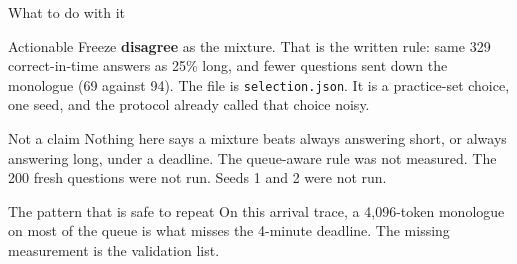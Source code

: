 \documentclass[aspectratio=169,11pt]{beamer}
\begin{document}
\begin{frame}{What to do with it}
  \begin{exampleblock}{Actionable}
    \small Freeze \textbf{disagree} as the mixture. That is the written rule: same 329 correct-in-time
    answers as 25\% long, and fewer questions sent down the monologue (69 against 94).
    The file is \texttt{selection.json}. It is a practice-set choice, one seed, and the protocol
    already called that choice noisy.
  \end{exampleblock}
  \vspace{0.2em}
  \begin{alertblock}{Not a claim}
    \small Nothing here says a mixture beats always answering short, or always answering long,
    under a deadline. The queue-aware rule was not measured. The 200 fresh questions were not run.
    Seeds 1 and 2 were not run.
  \end{alertblock}
  \vspace{0.2em}
  \begin{block}{The pattern that is safe to repeat}
    \small On this arrival trace, a 4{,}096-token monologue on most of the queue is what misses
    the 4-minute deadline. The missing measurement is the validation list.
  \end{block}
\end{frame}
\end{document}
